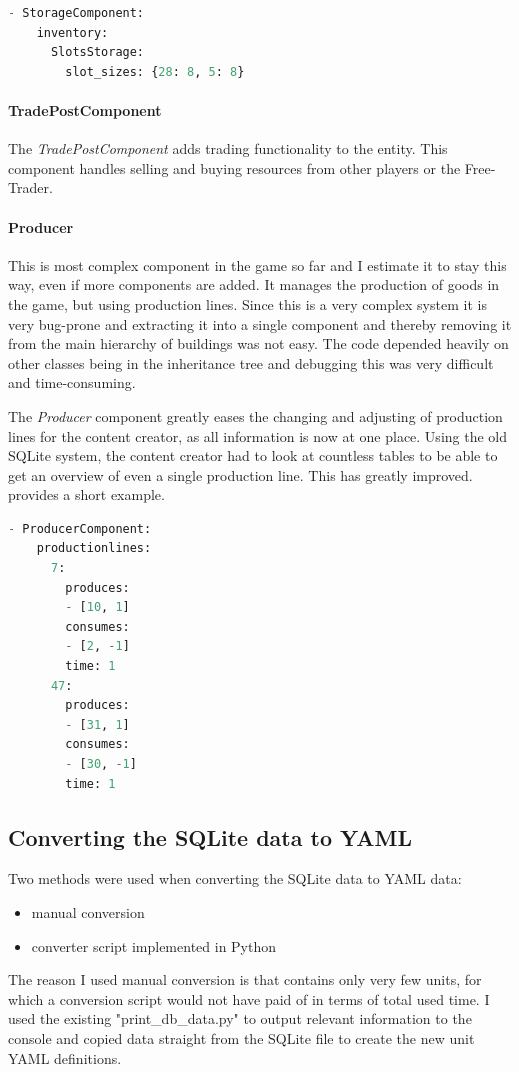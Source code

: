 \begin{lstlisting}[language=python,caption=YAML representation of the StorageComponent using a SlotStorage,
label=storagyaml]
- StorageComponent:
    inventory:
      SlotsStorage:
        slot_sizes: {28: 8, 5: 8}
\end{lstlisting}

\paragraph{TradePostComponent}
The \textit{TradePostComponent} adds trading functionality to the entity. This component handles selling and buying
resources from other players or the Free-Trader.

\paragraph{Producer}
This is most complex component in the game so far and I estimate it to stay this way, even if more components are added.
It manages the production of goods in the game, but using production lines. Since this is a very complex system it is
very bug-prone and extracting it into a single component and thereby removing it from the main hierarchy of buildings
was not easy. The code depended heavily on other classes being in the inheritance tree and debugging this was very
difficult and time-consuming.

The \textit{Producer} component greatly eases the changing and adjusting of production lines for the content creator, as
all information is now at one place. Using the old SQLite system, the content creator had to look at countless tables to
be able to get an overview of even a single production line. This has greatly improved.  provides a short
example.

\begin{lstlisting}[language=python,caption=YAML representation of the Producer with two production lines,
label=produceryaml]
- ProducerComponent:
    productionlines:
      7:
        produces:
        - [10, 1]
        consumes:
        - [2, -1]
        time: 1
      47:
        produces:
        - [31, 1]
        consumes:
        - [30, -1]
        time: 1
\end{lstlisting}

\subsection{Converting the SQLite data to YAML}
Two methods were used when converting the SQLite data to YAML data: 
\begin{itemize}
    \item manual conversion
    \item converter script implemented in Python
\end{itemize}
The reason I used manual conversion is that \UH{} contains only very few units, for which a conversion script would not
have paid of in terms of total used time. I used the existing "print\_db\_data.py" to output relevant information to the
console and copied data straight from the SQLite file to create the new unit YAML definitions.


